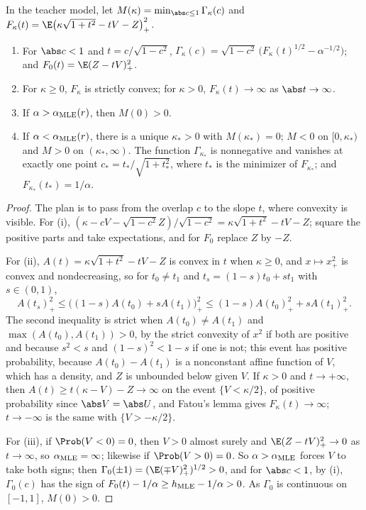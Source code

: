 \begin{refsection}
\begin{lemma}\label{lem:classification:scalar}
In the teacher model, let $M(\kappa)=\min_{\abs c\le1}\Gamma_\kappa(c)$ and $F_\kappa(t)=\E\bigl(\kappa\sqrt{1+t^2}-tV-Z\bigr)_+^2$.
\begin{enumerate}
\item For $\abs c<1$ and $t=c/\sqrt{1-c^2}$, $\Gamma_\kappa(c)=\sqrt{1-c^2}\,\bigl(F_\kappa(t)^{1/2}-\alpha^{-1/2}\bigr)$; and $F_0(t)=\E(Z-tV)_+^2$.
\item For $\kappa\ge0$, $F_\kappa$ is strictly convex; for $\kappa>0$, $F_\kappa(t)\to\infty$ as $\abs t\to\infty$.
\item If $\alpha>\alpha_{\mathrm{MLE}}(r)$, then $M(0)>0$.
\item If $\alpha<\alpha_{\mathrm{MLE}}(r)$, there is a unique $\kappa_*>0$ with $M(\kappa_*)=0$; $M<0$ on $[0,\kappa_*)$ and $M>0$ on $(\kappa_*,\infty)$. The function $\Gamma_{\kappa_*}$ is nonnegative and vanishes at exactly one point $c_*=t_*/\sqrt{1+t_*^2}$, where $t_*$ is the minimizer of $F_{\kappa_*}$; and $F_{\kappa_*}(t_*)=1/\alpha$.
\end{enumerate}
\end{lemma}

\begin{proof}
The plan is to pass from the overlap $c$ to the slope $t$, where convexity is visible. For (i), $(\kappa-cV-\sqrt{1-c^2}Z)/\sqrt{1-c^2}=\kappa\sqrt{1+t^2}-tV-Z$; square the positive parts and take expectations, and for $F_0$ replace $Z$ by $-Z$.

For (ii), $A(t)=\kappa\sqrt{1+t^2}-tV-Z$ is convex in $t$ when $\kappa\ge0$, and $x\mapsto x_+^2$ is convex and nondecreasing, so for $t_0\ne t_1$ and $t_s=(1-s)t_0+st_1$ with $s\in(0,1)$,
\[
A(t_s)_+^2\le\bigl((1-s)A(t_0)+sA(t_1)\bigr)_+^2\le(1-s)A(t_0)_+^2+sA(t_1)_+^2.
\]
The second inequality is strict when $A(t_0)\ne A(t_1)$ and $\max(A(t_0),A(t_1))>0$, by the strict convexity of $x^2$ if both are positive and because $s^2<s$ and $(1-s)^2<1-s$ if one is not; this event has positive probability, because $A(t_0)-A(t_1)$ is a nonconstant affine function of $V$, which has a density, and $Z$ is unbounded below given $V$. If $\kappa>0$ and $t\to+\infty$, then $A(t)\ge t(\kappa-V)-Z\to\infty$ on the event $\{V<\kappa/2\}$, of positive probability since $\abs V=\abs U$, and Fatou's lemma gives $F_\kappa(t)\to\infty$; $t\to-\infty$ is the same with $\{V>-\kappa/2\}$.

For (iii), if $\Prob(V<0)=0$, then $V>0$ almost surely and $\E(Z-tV)_+^2\to0$ as $t\to\infty$, so $\alpha_{\mathrm{MLE}}=\infty$; likewise if $\Prob(V>0)=0$. So $\alpha>\alpha_{\mathrm{MLE}}$ forces $V$ to take both signs; then $\Gamma_0(\pm1)=(\E(\mp V)_+^2)^{1/2}>0$, and for $\abs c<1$, by (i), $\Gamma_0(c)$ has the sign of $F_0(t)-1/\alpha\ge h_{\mathrm{MLE}}-1/\alpha>0$. As $\Gamma_0$ is continuous on $[-1,1]$, $M(0)>0$.


\end{proof}
\end{refsection}
